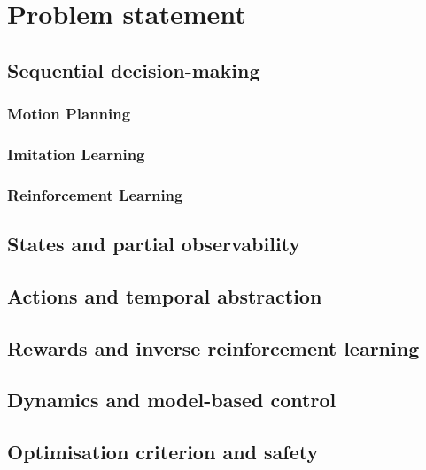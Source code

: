 
\chapter{Problem statement}
\label{chapter:2}

\section{Sequential decision-making}
\subsection{Motion Planning}
\subsection{Imitation Learning}
\subsection{Reinforcement Learning}
\section{States and partial observability}
\section{Actions and temporal abstraction}
\section{Rewards and inverse reinforcement learning}
\section{Dynamics and model-based control}
\section{Optimisation criterion and safety}